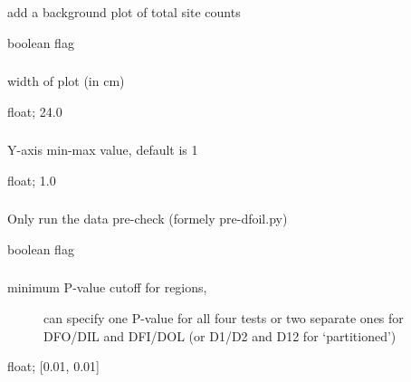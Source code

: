 \documentclass[letterpaper,12pt,english]{sphinxmanual}
\begin{document}
\subsubsection{}
\label{\detokenize{prog_desc:plot-totals}}
 add a background plot of total site counts

 boolean flag


\subsubsection{}
\label{\detokenize{prog_desc:plot-width}}
 width of plot (in cm)

 float;  24.0


\subsubsection{}
\label{\detokenize{prog_desc:plot-yscale}}
 Y-axis min-max value, default is 1

 float;  1.0


\subsubsection{}
\label{\detokenize{prog_desc:pre-check-only}}
 Only run the data pre-check (formely pre-dfoil.py)

 boolean flag


\subsubsection{}
\label{\detokenize{prog_desc:pvalue}}\begin{description}
\item[{ minimum P-value cutoff for regions,}] \leavevmode
can specify one P-value for all four tests
or two separate ones for DFO/DIL and DFI/DOL
(or D1/D2 and D12 for ‘partitioned’)

\end{description}

 float;  {[}0.01, 0.01{]}
\end{document}
